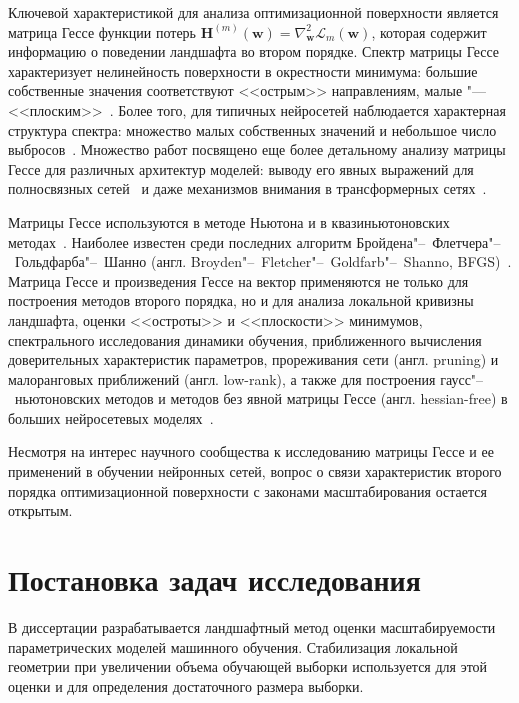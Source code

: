 Ключевой характеристикой для анализа оптимизационной поверхности является матрица Гессе функции потерь $\mathbf{H}^{(m)}(\mathbf{w}) = \nabla^2_{\mathbf{w}} \mathcal{L}_{m}(\mathbf{w})$, которая содержит информацию о поведении ландшафта во втором порядке. Спектр матрицы Гессе характеризует нелинейность поверхности в окрестности минимума: большие собственные значения соответствуют  <<острым>> направлениям, малые "--- <<плоским>>~\cite{hochreiter1997flat,dauphin2014,keskar2017largebatch,li2018visualizing}. Более того, для типичных нейросетей наблюдается характерная структура спектра: множество малых собственных значений и небольшое число выбросов~\cite{papyan2019,ghorbani2019investigation,sankar2021deeper,singh2021analytic}. Множество работ посвящено еще более детальному анализу матрицы Гессе для различных архитектур моделей: выводу его явных выражений для полносвязных сетей~\cite{bishop1992hessian,pearlmutter1994,martens2012curvprop} и даже механизмов внимания в трансформерных сетях~\cite{ormaniec2024transformerhessian}.

Матрицы Гессе используются в методе Ньютона и в квазиньютоновских методах~\cite{nocedal2006numerical,dennis1983}. Наиболее известен среди последних алгоритм Бройдена"--~Флетчера"--~Гольдфарба"--~Шанно (англ. Broyden"--~Fletcher"--~Goldfarb"--~Shanno, BFGS)~\cite{broyden1970,fletcher1970}. Матрица Гессе и произведения Гессе на вектор применяются не только для построения методов второго порядка, но и для анализа локальной кривизны ландшафта, оценки <<остроты>> и <<плоскости>> минимумов, спектрального исследования динамики обучения, приближенного вычисления доверительных характеристик параметров, прореживания сети (англ. pruning) и малоранговых приближений (англ. low-rank), а также для построения гаусс"--~ньютоновских методов и методов без явной матрицы Гессе (англ. hessian-free) в больших нейросетевых моделях~\cite{martens2010hf,martens2012curvprop,papyan2019,zhang2024whytransformers}.

Несмотря на интерес научного сообщества к исследованию матрицы Гессе и ее применений в обучении нейронных сетей, вопрос о связи характеристик второго порядка оптимизационной поверхности с законами масштабирования остается открытым.

\section{Постановка задач исследования}

В диссертации разрабатывается ландшафтный метод оценки масштабируемости параметрических моделей машинного обучения. Стабилизация локальной геометрии при увеличении объема обучающей выборки используется для этой оценки и для определения достаточного размера выборки.

